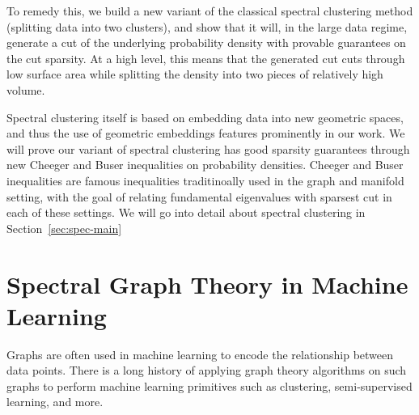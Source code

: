 To remedy this, we build a new variant of the classical spectral
clustering method (splitting data into two clusters), and show that it
will, in the large data regime, generate a cut of the underlying probability
density with provable guarantees on the cut sparsity. At a high level,
this means that the generated cut cuts through low surface area while splitting the density into
two pieces of relatively high volume.

Spectral clustering itself is based on embedding data into new geometric
spaces, and thus the use of geometric embeddings features prominently in
our work. We will prove our variant of spectral clustering has good
sparsity guarantees through new Cheeger and Buser inequalities on
probability densities. Cheeger and Buser inequalities are famous
inequalities traditinoally used in the graph and manifold setting, with
the goal of relating fundamental eigenvalues with sparsest cut in each
of these settings. We will go into detail about spectral clustering in
Section~\ref{sec:spec-main}

\section{Spectral Graph Theory in Machine
  Learning}\label{sec:sgt}
  Graphs are often used in machine learning to encode the relationship
  between data points. There is a long history of applying graph theory
  algorithms on such graphs to perform machine learning primitives such
  as clustering, semi-supervised learning, and more.

